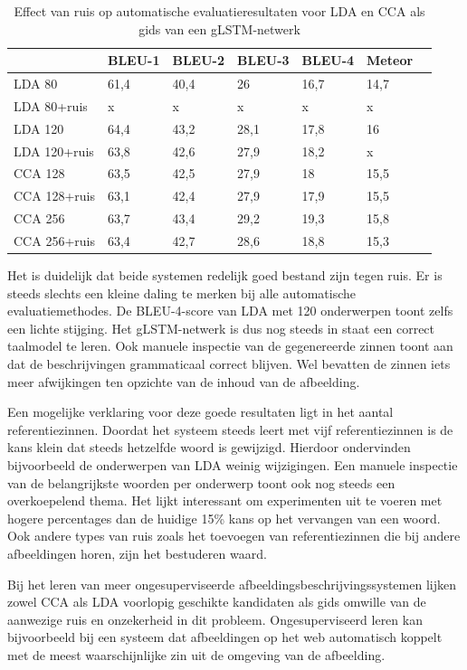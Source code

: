 \begin{table}
	\centering
	\begin{tabular}{lllllll}
		~                  & BLEU-1 & BLEU-2 & BLEU-3 & BLEU-4 & Meteor \\ \hline
		LDA 80        & 61,4   & 40,4 			& 26   & 16,7  & 14,7 \\
		LDA 80+ruis & x  &x    &x   & x   & x \\ \hline
		LDA 120   & 64,4   & 43,2   & 28,1   & 17,8 & 16 \\
		LDA 120+ruis   & 63,8   & 42,6   & 27,9   & 18,2 & x \\ \hline
		CCA 128   & 63,5   & 42,5   & 27,9   & 18 & 15,5 \\
		CCA 128+ruis   & 63,1   & 42,4   & 27,9   & 17,9 & 15,5 \\ \hline
		CCA 256   & 63,7   & 43,4   & 29,2   & 19,3 & 15,8 \\
		CCA 256+ruis   & 63,4  & 42,7   & 28,6   & 18,8 & 15,3 \\ \hline			
	\end{tabular}
	\caption{Effect van ruis op automatische evaluatieresultaten voor LDA en CCA als gids van een gLSTM-netwerk}
	\label{table:ruis}
\end{table}

Het is duidelijk dat beide systemen redelijk goed bestand zijn tegen ruis. Er is steeds slechts een kleine daling te merken bij alle automatische evaluatiemethodes. De BLEU-4-score van LDA met 120 onderwerpen toont zelfs een lichte stijging.
Het gLSTM-netwerk is dus nog steeds in staat een correct taalmodel te leren. Ook manuele inspectie van de gegenereerde zinnen toont aan dat de beschrijvingen grammaticaal correct blijven. Wel bevatten de zinnen iets meer afwijkingen ten opzichte van de inhoud van de afbeelding.

Een mogelijke verklaring voor deze goede resultaten ligt in het aantal referentiezinnen. Doordat het systeem steeds leert met vijf referentiezinnen is de kans klein dat steeds hetzelfde woord is gewijzigd. Hierdoor ondervinden bijvoorbeeld de onderwerpen van LDA weinig wijzigingen. Een manuele inspectie van de belangrijkste woorden per onderwerp toont ook nog steeds een overkoepelend thema.
Het lijkt interessant om experimenten uit te voeren met hogere percentages dan de huidige 15\% kans op het vervangen van een woord. Ook andere types van ruis zoals het toevoegen van referentiezinnen die bij andere afbeeldingen horen, zijn het bestuderen waard.

Bij het leren van meer ongesuperviseerde afbeeldingsbeschrijvingssystemen lijken zowel CCA als LDA voorlopig geschikte kandidaten als gids omwille van de aanwezige ruis en onzekerheid in dit probleem. Ongesuperviseerd leren kan bijvoorbeeld bij een systeem dat afbeeldingen op het web automatisch koppelt met de meest waarschijnlijke zin uit de omgeving van de afbeelding.



